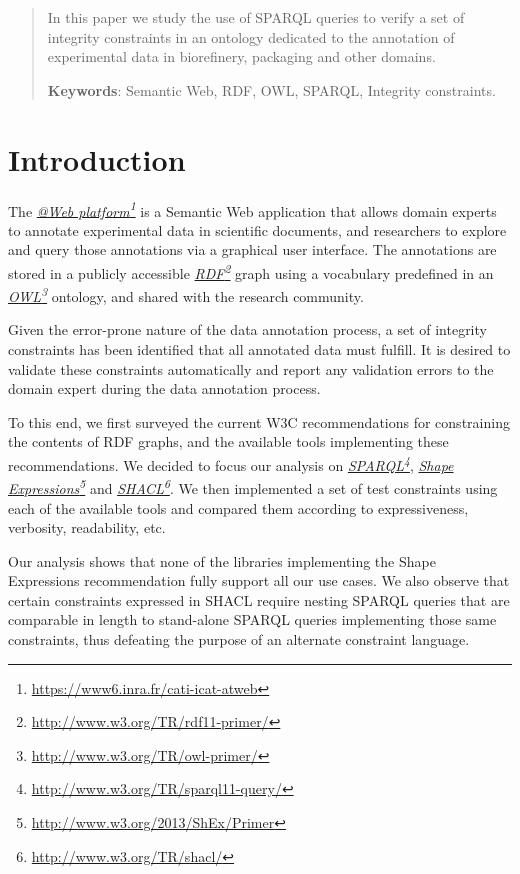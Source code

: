 \documentclass[a4paper, 10pt]{article}
\newcommand{\fnhref}[2]{\href{#2}{#1}\footnote{\url{#2}}}
\newcommand{\ifnhref}[2]{\textit{\fnhref{#1}{#2}}}
\begin{document}
\begin{abstract}
  In this paper we study the use of SPARQL queries to verify a set of integrity
  constraints in an ontology dedicated to the annotation of experimental data
  in biorefinery, packaging and other domains.

  \vspace{1em}

  \textbf{Keywords}: Semantic Web, RDF, OWL, SPARQL, Integrity constraints.
\end{abstract}

\section{Introduction}

The \ifnhref{@Web platform}{https://www6.inra.fr/cati-icat-atweb} is a Semantic
Web application that allows domain experts to annotate experimental data in
scientific documents, and researchers to explore and query those annotations
via a graphical user interface. The annotations are stored in a publicly
accessible \ifnhref{RDF}{http://www.w3.org/TR/rdf11-primer/} graph using a
vocabulary predefined in an \ifnhref{OWL}{http://www.w3.org/TR/owl-primer/}
ontology, and shared with the research community.

Given the error-prone nature of the data annotation process, a set of integrity
constraints has been identified that all annotated data must fulfill. It is
desired to validate these constraints automatically and report any validation
errors to the domain expert during the data annotation process.

To this end, we first surveyed the current W3C recommendations for constraining
the contents of RDF graphs, and the available tools implementing these
recommendations. We decided to focus our analysis on
\ifnhref{SPARQL}{http://www.w3.org/TR/sparql11-query/}, \ifnhref{Shape
Expressions}{http://www.w3.org/2013/ShEx/Primer} and
\ifnhref{SHACL}{http://www.w3.org/TR/shacl/}. We then implemented a set of test
constraints using each of the available tools and compared them according to
expressiveness, verbosity, readability, etc.

Our analysis shows that none of the libraries implementing the Shape
Expressions recommendation fully support all our use cases. We also observe
that certain constraints expressed in SHACL require nesting SPARQL queries that
are comparable in length to stand-alone SPARQL queries implementing those same
constraints, thus defeating the purpose of an alternate constraint language.
\end{document}
